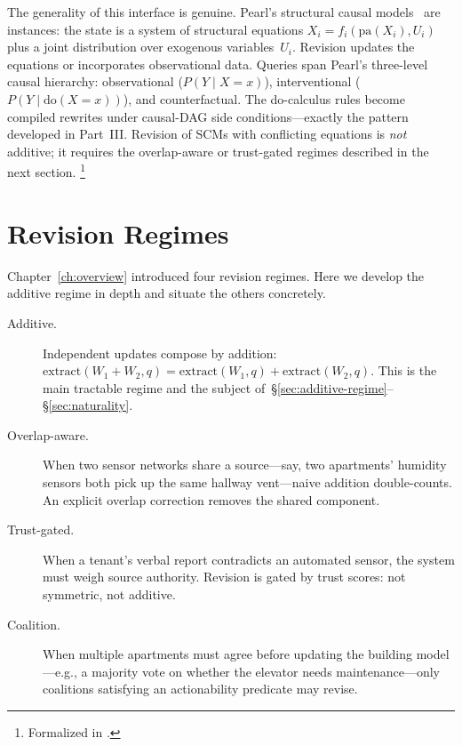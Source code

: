 \documentclass[11pt,openany]{report}
\begin{document}
The generality of this interface is genuine.  Pearl's structural
causal models~\cite{Pearl2009} are  instances: the
state is a system of structural equations $X_i = f_i(\mathrm{pa}(X_i),
U_i)$ plus a joint distribution over exogenous variables~$U_i$.
Revision updates the equations or incorporates observational data.
Queries span Pearl's three-level causal hierarchy: observational
($P(Y \mid X = x)$), interventional ($P(Y \mid \mathrm{do}(X = x))$),
and counterfactual.  The do-calculus rules become compiled rewrites
under causal-DAG side conditions---exactly the pattern developed in
Part~III.  Revision of SCMs with conflicting equations
is \emph{not} additive; it requires the overlap-aware or trust-gated
regimes described in the next section.%
\footnote{Formalized in
.}



\section{Revision Regimes}

Chapter~\ref{ch:overview} introduced four revision regimes.  Here
we develop the additive regime in depth and situate the others
concretely.

\begin{description}
\item[Additive.]  Independent updates compose by addition:
  $\mathrm{extract}(W_1 + W_2, q) = \mathrm{extract}(W_1, q) +
  \mathrm{extract}(W_2, q)$.  This is the main tractable regime and
  the subject of~\S\ref{sec:additive-regime}--\S\ref{sec:naturality}.

\item[Overlap-aware.]  When two sensor networks share a source---say,
  two apartments' humidity sensors both pick up the same hallway
  vent---naive addition double-counts.  An explicit overlap correction
  removes the shared component.

\item[Trust-gated.]  When a tenant's verbal report contradicts an
  automated sensor, the system must weigh source authority.  Revision
  is gated by trust scores: not symmetric, not additive.

\item[Coalition.]  When multiple apartments must agree before updating
  the building model---e.g., a majority vote on whether the elevator
  needs maintenance---only coalitions satisfying an actionability
  predicate may revise.
\end{description}
\end{document}
